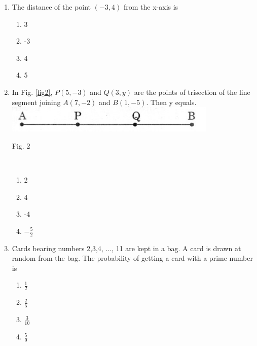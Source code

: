 \documentclass[journal,12pt,twocolumn]{IEEEtran}
\renewcommand\thesection{\arabic{section}}
\begin{document}
\begin{enumerate}[label=\thesection.\arabic*.,ref=\thesection.\theenumi]
\begin{enumerate}[A]
 \end{enumerate}
\item The distance of the point $(-3 , 4)$ from the x-axis is
 \begin{enumerate}[A]
    \item 3\\
    \item -3\\
    \item 4\\
    \item 5 \\
 \end{enumerate}
\item In Fig. \ref{fig2}, $P(5, -3)$ and $Q(3, y)$ are the points of trisection of the line segment joining $A(7, -2)$ and $B(1, -5)$. Then y equals.\\

\includegraphics[width=0.5\columnwidth,center]{2.png}\\{\centering
\caption{Fig. 2}\\}
\label{fig2}
 \begin{enumerate}[A]
  \item 2\\
  \item 4 \\
  \item -4 \\
  \item $-\frac{5}{2}$
\end{enumerate}
\item Cards bearing numbers 2,3,4, ..., 11 are kept in a bag. A card is drawn at random from the bag. The probability of getting a card with a prime number is\\
 \begin{enumerate}
     \item $\frac{1}{2}$\\
     \item $\frac{2}{5}$\\
     \item $\frac{3}{10}$\\
     \item $\frac{5}{9}$\\
 \end{enumerate}
 \end{enumerate}
\end{document}
